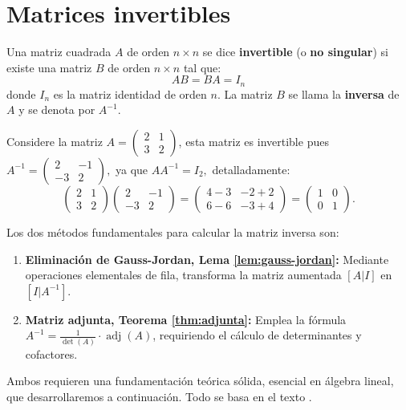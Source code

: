 \section{Matrices invertibles}

\begin{definition}
Una matriz cuadrada $A$ de orden $n \times n$ se dice \textbf{invertible} (o \textbf{no singular}) si existe una matriz $B$ de orden $n \times n$ tal que:
$$AB = BA = I_n$$
donde $I_n$ es la matriz identidad de orden $n$. La matriz $B$ se llama la \textbf{inversa} de $A$ y se denota por $A^{-1}$.
\end{definition}

\begin{example}
Considere la matriz $A = \begin{pmatrix} 2 & 1 \\ 3 & 2 \end{pmatrix}$, esta matriz es invertible pues $A^{-1}= \begin{pmatrix} 2 & -1 \\ -3 & 2 \end{pmatrix},$ ya que $AA^{-1} = I_2,$ detalladamente:
$$\begin{pmatrix} 2 & 1 \\ 3 & 2 \end{pmatrix} \begin{pmatrix} 2 & -1 \\ -3 & 2 \end{pmatrix} = \begin{pmatrix} 4-3 & -2+2 \\ 6-6 & -3+4 \end{pmatrix} = \begin{pmatrix} 1 & 0 \\ 0 & 1 \end{pmatrix}.$$
\end{example}

\begin{theorem}
Los dos métodos fundamentales para calcular la matriz inversa son:
\begin{enumerate}
\item \textbf{Eliminación de Gauss-Jordan, Lema \ref{lem:gauss-jordan}:} Mediante operaciones elementales de fila, transforma la matriz aumentada $[A|I]$ en $[I|A^{-1}]$. 
\item \textbf{Matriz adjunta, Teorema \ref{thm:adjunta}:} Emplea la fórmula $A^{-1} = \frac{1}{\det(A)} \cdot \operatorname{adj}(A)$, requiriendo el cálculo de determinantes y cofactores.
\end{enumerate}
Ambos requieren una fundamentación teórica sólida, esencial en álgebra lineal, que desarrollaremos a continuación. Todo se basa en el texto \cite{araujo2014algebra}.
\end{theorem}
